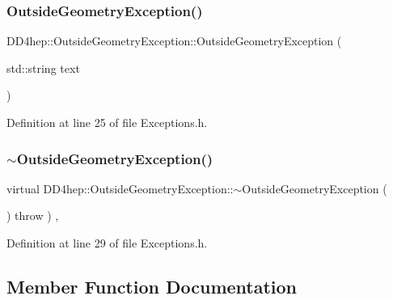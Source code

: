 \subsubsection{\texorpdfstring{Outside\+Geometry\+Exception()}{OutsideGeometryException()}\hspace{0.1cm}{\footnotesize\ttfamily [2/2]}}
{\footnotesize\ttfamily D\+D4hep\+::\+Outside\+Geometry\+Exception\+::\+Outside\+Geometry\+Exception (\begin{DoxyParamCaption}\item[{std\+::string}]{text }\end{DoxyParamCaption})\hspace{0.3cm}{\ttfamily [inline]}}



Definition at line 25 of file Exceptions.\+h.

\hypertarget{class_d_d4hep_1_1_outside_geometry_exception_a7e9be9d6e116f089183a65ab413daa56}{}\label{class_d_d4hep_1_1_outside_geometry_exception_a7e9be9d6e116f089183a65ab413daa56} 
\subsubsection{\texorpdfstring{$\sim$\+Outside\+Geometry\+Exception()}{~OutsideGeometryException()}}
{\footnotesize\ttfamily virtual D\+D4hep\+::\+Outside\+Geometry\+Exception\+::$\sim$\+Outside\+Geometry\+Exception (\begin{DoxyParamCaption}{ }\end{DoxyParamCaption}) throw  ) \hspace{0.3cm}{\ttfamily [inline]}, {\ttfamily [virtual]}}



Definition at line 29 of file Exceptions.\+h.



\subsection{Member Function Documentation}
\hypertarget{class_d_d4hep_1_1_outside_geometry_exception_a8b4b4c2ecb8f24f0ffb90dfdb841eb96}{}\label{class_d_d4hep_1_1_outside_geometry_exception_a8b4b4c2ecb8f24f0ffb90dfdb841eb96} 
